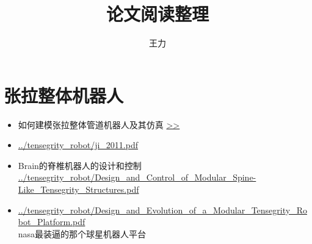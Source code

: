 \documentclass[12pt]{article}%
\title{论文阅读整理}%
\author{王力}
\begin{document}
\maketitle

\section{张拉整体机器人}

\begin{itemize}
\item 如何建模张拉整体管道机器人及其仿真 
    \href{../tensegrity_robot/Xydes_2015.pdf}{>>}

\item \url{../tensegrity_robot/ji_2011.pdf}

\item Brain的脊椎机器人的设计和控制 
\url{../tensegrity_robot/Design_and_Control_of_Modular_Spine-Like_Tensegrity_Structures.pdf}
 
\item
\url{../tensegrity_robot/Design_and_Evolution_of_a_Modular_Tensegrity_Robot_Platform.pdf}
\\ nasa最装逼的那个球星机器人平台


\end{itemize}
\end{document}
